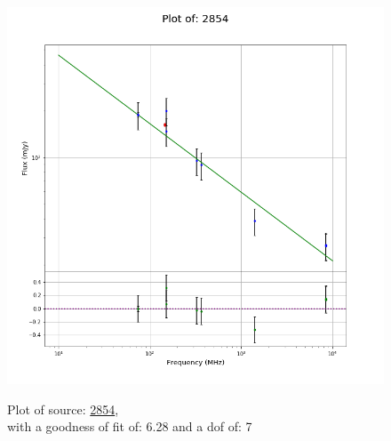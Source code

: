 \documentclass{article}
\begin{document}
\begin{figure}[H]
    \centering
    \begin{minipage}{.5\textwidth}
        \centering
        \includegraphics[scale = 0.35]{KmeulenTrap4P23_1hr/1hr2854.png}
        \captionsetup{labelformat=empty}
        \caption{Plot of source: \href{http://banana.transientskp.org/r4/vlo_KmeulenTrap4P23/runningcatalog/2854}{2854},\\with a goodness of fit of: 6.28 and a dof of: 7}
        \addtocounter{figure}{-1}
        \label{KmeulenTrap4P23:1hr:2854:plot}
    \end{minipage}%
    \begin{minipage}{0.5\textwidth}
        \centering


\end{minipage}
\end{figure}
\end{document}

